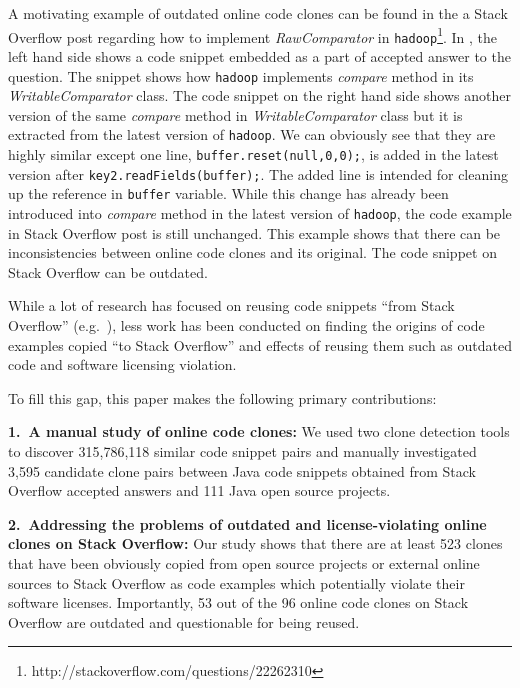 \documentclass{sig-alternate-05-2015}
\begin{document}
A motivating example of outdated online code clones can be found in the a Stack Overflow post regarding how to implement \textit{RawComparator} in \texttt{hadoop}\footnote{http://stackoverflow.com/questions/22262310}. In , the left hand side shows a code snippet embedded as a part of accepted answer to the question. The snippet shows how \texttt{hadoop} implements \textit{compare} method in its \textit{WritableComparator} class. The code snippet on the right hand side shows another version of the same \textit{compare} method in \textit{WritableComparator} class but it is extracted from the latest version of \texttt{hadoop}. We can obviously see that they are highly similar except one line, \verb|buffer.reset(null,0,0);|, is added in the latest version after \verb|key2.readFields(buffer);|. The added line is intended for cleaning up the reference in \verb|buffer| variable. While this change has already been introduced into \textit{compare} method in the latest version of \texttt{hadoop}, the code example in Stack Overflow post is still unchanged. This example shows that there can be inconsistencies between online code clones and its original. The code snippet on Stack Overflow can be outdated.  %

While a lot of research has focused on reusing code snippets ``from Stack Overflow'' (e.g.~\cite{Keivanloo2014,An2017,Yang2016}), less work has been conducted on finding the origins of code examples copied ``to Stack Overflow'' and effects of reusing them such as outdated code and software licensing violation.

To fill this gap, this paper makes the following  primary contributions:

\vspace{0.5ex}%
\noindent\textbf{1.~A manual study of online code clones:} 
We used two clone detection tools to discover 315,786,118 similar code snippet pairs and manually investigated 3,595 candidate clone pairs between Java code snippets obtained from Stack Overflow accepted answers and 111 Java open source projects.

\vspace{0.5ex}%
\noindent\textbf{2.~Addressing the problems of outdated and license-violating online clones on Stack Overflow:} Our study shows that there are at least 523 clones that have been obviously copied from open source projects or external online sources to Stack Overflow as code examples which potentially violate their software licenses. Importantly, 53 out of the 96 online code clones on Stack Overflow are outdated and questionable for being reused.
\end{document}
